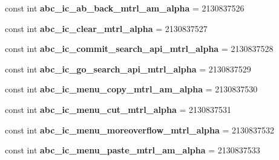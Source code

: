 \begin{DoxyCompactItemize}
\item 
\hypertarget{classClient_1_1Droid_1_1Resource_1_1Drawable_afc9cf7bb5dd79fee519a7fd4de19c1b7}{}const int {\bfseries abc\+\_\+ic\+\_\+ab\+\_\+back\+\_\+mtrl\+\_\+am\+\_\+alpha} = 2130837526\label{classClient_1_1Droid_1_1Resource_1_1Drawable_afc9cf7bb5dd79fee519a7fd4de19c1b7}

\item 
\hypertarget{classClient_1_1Droid_1_1Resource_1_1Drawable_a3ab3b46c5ee98214bb6c75c8e326896d}{}const int {\bfseries abc\+\_\+ic\+\_\+clear\+\_\+mtrl\+\_\+alpha} = 2130837527\label{classClient_1_1Droid_1_1Resource_1_1Drawable_a3ab3b46c5ee98214bb6c75c8e326896d}

\item 
\hypertarget{classClient_1_1Droid_1_1Resource_1_1Drawable_af6987b022208de317ef80857b4f0c5c8}{}const int {\bfseries abc\+\_\+ic\+\_\+commit\+\_\+search\+\_\+api\+\_\+mtrl\+\_\+alpha} = 2130837528\label{classClient_1_1Droid_1_1Resource_1_1Drawable_af6987b022208de317ef80857b4f0c5c8}

\item 
\hypertarget{classClient_1_1Droid_1_1Resource_1_1Drawable_ae808d59a2138f42b10c5b0ec076336ed}{}const int {\bfseries abc\+\_\+ic\+\_\+go\+\_\+search\+\_\+api\+\_\+mtrl\+\_\+alpha} = 2130837529\label{classClient_1_1Droid_1_1Resource_1_1Drawable_ae808d59a2138f42b10c5b0ec076336ed}

\item 
\hypertarget{classClient_1_1Droid_1_1Resource_1_1Drawable_a88549b64c6d41dc738acb662698d3a70}{}const int {\bfseries abc\+\_\+ic\+\_\+menu\+\_\+copy\+\_\+mtrl\+\_\+am\+\_\+alpha} = 2130837530\label{classClient_1_1Droid_1_1Resource_1_1Drawable_a88549b64c6d41dc738acb662698d3a70}

\item 
\hypertarget{classClient_1_1Droid_1_1Resource_1_1Drawable_a96ae13fbcd8b1b1779e61eeb0c245c49}{}const int {\bfseries abc\+\_\+ic\+\_\+menu\+\_\+cut\+\_\+mtrl\+\_\+alpha} = 2130837531\label{classClient_1_1Droid_1_1Resource_1_1Drawable_a96ae13fbcd8b1b1779e61eeb0c245c49}

\item 
\hypertarget{classClient_1_1Droid_1_1Resource_1_1Drawable_a00e1df46709e300bb4ad74c9f443ee29}{}const int {\bfseries abc\+\_\+ic\+\_\+menu\+\_\+moreoverflow\+\_\+mtrl\+\_\+alpha} = 2130837532\label{classClient_1_1Droid_1_1Resource_1_1Drawable_a00e1df46709e300bb4ad74c9f443ee29}

\item 
\hypertarget{classClient_1_1Droid_1_1Resource_1_1Drawable_a11ef3caace428965545843694c7179ec}{}const int {\bfseries abc\+\_\+ic\+\_\+menu\+\_\+paste\+\_\+mtrl\+\_\+am\+\_\+alpha} = 2130837533\label{classClient_1_1Droid_1_1Resource_1_1Drawable_a11ef3caace428965545843694c7179ec}


\end{DoxyCompactItemize}
